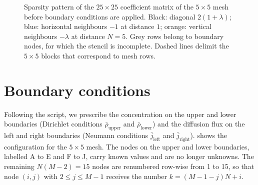 \documentclass[11pt,a4paper]{article}
\numberwithin{equation}{section}
\theoremstyle{definition}
\theoremstyle{remark}
\newcommand{\rhoUpper}{\bar{\rho}_{\mathrm{upper}}}
\newcommand{\rhoLower}{\bar{\rho}_{\mathrm{lower}}}
\newcommand{\jleft}{\bar{j}_{\mathrm{left}}}
\newcommand{\jright}{\bar{j}_{\mathrm{right}}}
\begin{document}
\begin{figure}[ht]
  \centering
  \caption{Sparsity pattern of the $25 \times 25$ coefficient matrix of the $5 \times 5$
    mesh before boundary conditions are applied. Black: diagonal $2(1 + \lambda)$; blue:
    horizontal neighbours $-1$ at distance $1$; orange: vertical neighbours $-\lambda$ at
    distance $N = 5$. Grey rows belong to boundary nodes, for which the stencil is
    incomplete. Dashed lines delimit the $5\times5$ blocks that correspond to mesh rows.}
  \label{fig:sparsity}
\end{figure}

\section{Boundary conditions}\label{sec:bc}

Following the script, we prescribe the concentration on the upper and lower boundaries
(Dirichlet conditions $\rhoUpper$ and $\rhoLower$) and the diffusion flux on the left and right
boundaries (Neumann conditions $\jleft$ and $\jright$).  shows the
configuration for the $5 \times 5$ mesh. The nodes on the upper and lower boundaries,
labelled A to E and F to J, carry known values and are no longer unknowns. The remaining
$N(M - 2) = 15$ nodes are renumbered row-wise from 1 to 15, so that node $(i,j)$ with
$2 \le j \le M - 1$ receives the number $k = (M - 1 - j)N + i$.
\end{document}
